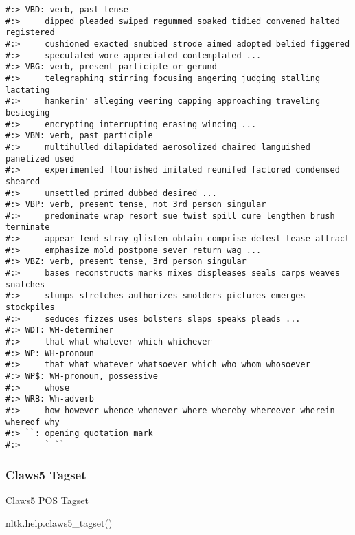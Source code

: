 \documentclass[
]{book}
\newenvironment{Shaded}{\begin{snugshade}}{\end{snugshade}}
\newcommand{\BuiltInTok}[1]{#1}
\newcommand{\NormalTok}[1]{#1}
\begin{document}
\begin{verbatim}
#:> VBD: verb, past tense
#:>     dipped pleaded swiped regummed soaked tidied convened halted registered
#:>     cushioned exacted snubbed strode aimed adopted belied figgered
#:>     speculated wore appreciated contemplated ...
#:> VBG: verb, present participle or gerund
#:>     telegraphing stirring focusing angering judging stalling lactating
#:>     hankerin' alleging veering capping approaching traveling besieging
#:>     encrypting interrupting erasing wincing ...
#:> VBN: verb, past participle
#:>     multihulled dilapidated aerosolized chaired languished panelized used
#:>     experimented flourished imitated reunifed factored condensed sheared
#:>     unsettled primed dubbed desired ...
#:> VBP: verb, present tense, not 3rd person singular
#:>     predominate wrap resort sue twist spill cure lengthen brush terminate
#:>     appear tend stray glisten obtain comprise detest tease attract
#:>     emphasize mold postpone sever return wag ...
#:> VBZ: verb, present tense, 3rd person singular
#:>     bases reconstructs marks mixes displeases seals carps weaves snatches
#:>     slumps stretches authorizes smolders pictures emerges stockpiles
#:>     seduces fizzes uses bolsters slaps speaks pleads ...
#:> WDT: WH-determiner
#:>     that what whatever which whichever
#:> WP: WH-pronoun
#:>     that what whatever whatsoever which who whom whosoever
#:> WP$: WH-pronoun, possessive
#:>     whose
#:> WRB: Wh-adverb
#:>     how however whence whenever where whereby whereever wherein whereof why
#:> ``: opening quotation mark
#:>     ` ``
\end{verbatim}

\hypertarget{claws5-tagset}{%
\subsubsection{Claws5 Tagset}\label{claws5-tagset}}

\href{https://www.sketchengine.eu/english-claws5-part-of-speech-tagset/}{Claws5 POS Tagset}

\begin{Shaded}
\begin{Highlighting}[]
\NormalTok{nltk.}\BuiltInTok{help}\NormalTok{.claws5\_tagset()}
\end{Highlighting}
\end{Shaded}
\end{document}
